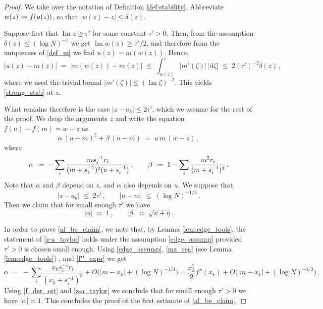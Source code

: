 \documentclass[11pt]{article} %
\numberwithin{equation}{section}
\numberwithin{figure}{section}
\theoremstyle{plain} %
\theoremstyle{definition} %
\newcommand{\dd}{\mathrm{d}}
\newcommand*{\deq}{\mathrel{\vcenter{\baselineskip0.65ex \lineskiplimit0pt \hbox{.}\hbox{.}}}=}
\renewcommand{\leq}{\leqslant}
\renewcommand{\geq}{\geqslant}
\newcommand{\pb}[1]{\bigl({#1}\bigr)}
\newcommand{\abs}[1]{\lvert #1 \rvert}
\DeclareMathOperator{\im}{Im}
\begin{document}
\begin{proof}
We take over the notation of Definition \ref{def:stability}. Abbreviate $w(z) \deq f(u(z))$, so that $\abs{w(z) - z} \leq \delta(z)$.

Suppose first that $\im z \geq \tau'$ for some constant $\tau' > 0$. Then, from the assumption $\delta(z) \leq (\log N)^{-1}$ we get $\im w(z) \geq \tau'/2$, and therefore from the uniqueness of \eqref{def_m} we find $u(z) = m(w(z))$. Hence,
\begin{equation*}
\abs{u(z) - m(z)} \;=\; \abs{m(w(z)) - m(z)} \;\leq\; \int_{w(z)}^z \abs{m'(\zeta)} \, \abs{\dd \zeta} \;\leq\; 2 (\tau')^{-2} \delta(z)\,,
\end{equation*}
where we used the trivial bound $\abs{m'(\zeta)} \leq (\im \zeta)^{-2}$. This yields \eqref{strong_stab} at $z$.

What remains therefore is the case $\abs{z - a_k} \leq 2 \tau'$, which we assume for the rest of the proof. We drop the arguments $z$ and write the equation $f(u) - f(m) = w - z$ as
\begin{equation} \label{quadr_edge}
\alpha \, (u - m)^2 + \beta \, (u - m) \;=\; u \, m \, (w-z)\,,
\end{equation}
where
\begin{equation} \label{def_al_be}
\alpha \;\deq\; - \sum_i \frac{m s_i^{-1} r_i}{(m + s_i^{-1})^2 (u + s_i^{-1})}\,, \qquad
\beta \;\deq\; 1 - \sum_i \frac{m^2 r_i}{(m + s_i^{-1})^2}\,.
\end{equation}
Note that $\alpha$ and $\beta$ depend on $z$, and $\alpha$ also depends on $u$. We suppose that
\begin{equation} \label{edge_assump}
\abs{z - a_k} \;\leq\; 2 \tau' \,, \qquad \abs{u - m} \;\leq\; (\log N)^{-1/3}\,.
\end{equation}
Then we claim that for small enough $\tau'$ we have
\begin{equation} \label{al_be_claim}
\abs{\alpha} \;\asymp\; 1 \,, \qquad \abs{\beta} \;\asymp\; \sqrt{\kappa + \eta}.
\end{equation}

In order to prove \eqref{al_be_claim}, we note that, by Lemma \ref{lem:edge_tools}, the statement of \eqref{z-a_taylor} holds under the assumption \eqref{edge_assump} provided $\tau' > 0$ is chosen small enough.
Using \eqref{edge_assump}, \eqref{mz_reg} (see Lemma \ref{lem:edge_tools}) , and \eqref{f''_expr} we get
\begin{equation*}
\alpha \;=\; - \sum_i \frac{x_k s_i^{-1} r_i}{(x_k + s_i^{-1})^3} + O \pb{\abs{m - x_k} + (\log N)^{-1/3}} = \frac{x_k^2}{2} f''(x_k) + O \pb{\abs{m - x_k} + (\log N)^{-1/3}}\,.
\end{equation*}
Using \eqref{f_der_est} and \eqref{z-a_taylor} we conclude that for small enough $\tau' > 0$ we have $\abs{\alpha} \asymp 1$. This concludes the proof of the first estimate of \eqref{al_be_claim}.


\end{proof}
\end{document}
